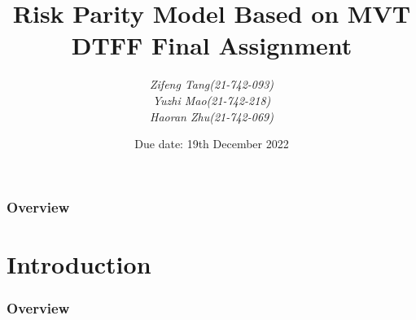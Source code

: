 \documentclass{beamer}
\title[]{\textbf{Risk Parity Model Based on MVT}\\ DTFF Final Assignment} %
\author{\textit{Zifeng Tang(21-742-093)} \\ \textit{Yuzhi Mao(21-742-218)} \\ \textit{Haoran Zhu(21-742-069)} }
\date{Due date: 19th December 2022}
\begin{document}
\begin{frame}
\titlepage %
\end{frame}

\begin{frame}
\frametitle{Overview} %
\tableofcontents %
\end{frame}


\section{Introduction} %
\begin{frame}
\frametitle{Overview} %
\tableofcontents[currentsection] %
\end{frame}
\end{document}
